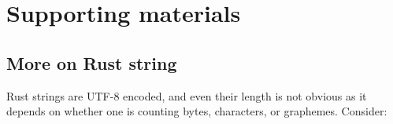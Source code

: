 \documentclass[nomenclature, english, bibtex]{kththesis}
\newcommand*{\warningExpl}[1]{\todo[inline, backgroundcolor=kth-lightred40]{#1}} %
\begin{document}
\cleardoublepage
\renewcommand{\bibname}{References}

\ifbiblatex
    \printbibliography[heading=bibintoc]
\else
    
\fi



\cleardoublepage
\appendix
\renewcommand{\chaptermark}[1]{\markboth{Appendix \thechapter\relax:\thinspace\relax#1}{}}
\chapter{Supporting materials}
\label{sec:supportingMaterial}

\section{More on Rust string}
Rust strings are UTF-8 encoded, and even their length is not obvious as it depends on whether one is counting bytes, characters, or graphemes. Consider:
\end{document}
